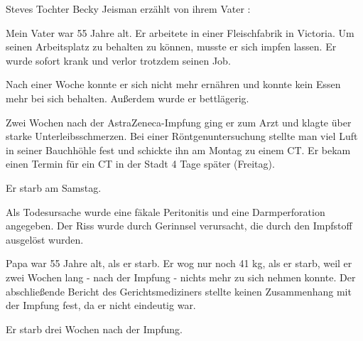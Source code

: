 Steves Tochter Becky Jeisman erzählt von ihrem Vater :

Mein Vater war 55 Jahre alt. Er arbeitete in einer Fleischfabrik in Victoria. Um
seinen Arbeitsplatz zu behalten zu können, musste er sich impfen lassen. Er
wurde sofort krank und verlor trotzdem seinen Job.

Nach einer Woche konnte er sich nicht mehr ernähren und konnte kein Essen mehr
bei sich behalten. Außerdem wurde er bettlägerig.

Zwei Wochen nach der AstraZeneca-Impfung ging er zum Arzt und klagte über starke
Unterleibsschmerzen. Bei einer Röntgenuntersuchung stellte man viel Luft in
seiner Bauchhöhle fest und schickte ihn am Montag zu einem CT. Er bekam einen
Termin für ein CT in der Stadt 4 Tage später (Freitag).

Er starb am Samstag.

Als Todesursache wurde eine fäkale Peritonitis und eine Darmperforation
angegeben. Der Riss wurde durch Gerinnsel verursacht, die durch den Impfstoff
ausgelöst wurden.

Papa war 55 Jahre alt, als er starb. Er wog nur noch 41 kg, als er starb, weil
er zwei Wochen lang - nach der Impfung - nichts mehr zu sich nehmen konnte. Der
abschließende Bericht des Gerichtsmediziners stellte keinen Zusammenhang mit der
Impfung fest, da er nicht eindeutig war.

Er starb drei Wochen nach der Impfung.
